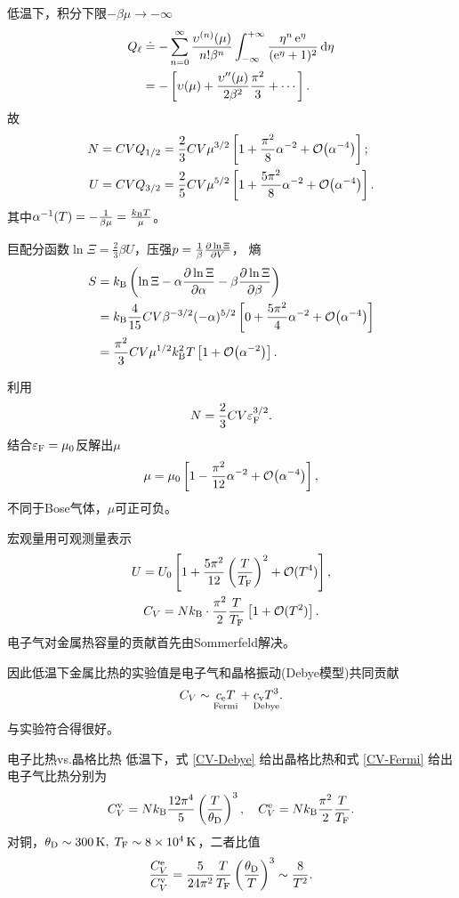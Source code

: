 低温下，积分下限$-\beta\mu\to-\infty$
\begin{align*}
	Q_\ell&\doteq-\sum_{n=0}^{\infty}\frac{\upsilon^{(n)}(\mu)}{n!\beta^n}\int_{-\infty}^{+\infty}\frac{\eta^n\mathop{}\!\mathrm{e}^\eta}{(\mathop{}\!\mathrm{e}^\eta+1)^2}\mathop{}\!\mathrm{d}\eta\\
	&=-\left[\upsilon(\mu)+\frac{\upsilon''(\mu)}{2\beta^2}\frac{\pi^2}3+\cdots\right].
\end{align*}
故
\begin{align}
	N=CVQ_{1/2}&=\frac23CV\mu^{3/2}\left[1+\frac{\pi^2}8\alpha^{-2}+\mathcal O\!\left(\alpha^{-4}\right)\right];\\
	U=CVQ_{3/2}&=\frac25CV\mu^{5/2}\left[1+\frac{5\pi^2}8\alpha^{-2}+\mathcal O\!\left(\alpha^{-4}\right)\right].
\end{align}
其中$\alpha^{-1}(T)=-\frac1{\beta\mu}=\frac{k_{\mathrm B} T}{\mu}$。

巨配分函数$\ln\Xi=\frac23\beta U$，压强$p=\frac1\beta\frac{\partial^{\;\!\!}\ln\Xi}{\partial V^{\;\!\!}}$，
熵
\begin{align}\notag
	S&=\kB\kh{\ln\Xi-\alpha\pv{\ln\Xi}\alpha-\beta\pv{\ln\Xi}\beta}\\\notag
	&=\kB\frac4{15}CV\beta^{-3/2}(-\alpha)^{5/2}\fkh{0+\frac{5\pi^2}4\alpha^{-2}+\bigo\!\kh{\alpha^{-4}}}\\
	&=\frac{\pi^2}3CV\mu^{1/2}\kB^2T\fkh{1+\bigo\!\kh{\alpha^{-2}}}.
\end{align}

利用
\[
	N=\frac23CV\varepsilon_\mathrm F^{3/2}.
\]
结合$\varepsilon_\mathrm F=\mu_0$反解出$\mu$
\[
	\mu=\mu_0\left[1-\frac{\pi^2}{12}\alpha^{-2}+\mathcal O\!\left(\alpha^{-4}\right)\right],
\]
不同于Bose气体，$\mu$可正可负。

宏观量用可观测量表示
\begin{gather}
	U=U_0\left[1+\frac{5\pi^2}{12}\left(\frac T{T_\mathrm F}\right)^2+\mathcal O(T^4)\right],\\
	C_V=Nk_{\mathrm B}\cdot\frac{\pi^2}{2}\frac T{T_\mathrm F}\left[1+\mathcal O(T^2)\right].\label{CV-Fermi}
\end{gather}
电子气对金属热容量的贡献首先由Sommerfeld解决。

因此低温下金属比热的实验值是电子气和晶格振动(Debye模型)共同贡献
\[
	C_V\sim \underset{\text{Fermi}}{c_\mathrm e T}+\underset{\text{Debye}}{c_\mathrm v T^3}.
\]
与实验符合得很好。
\begin{example}{电子比热vs.晶格比热}{}
	低温下，式 \ref{CV-Debye} 给出晶格比热和式 \ref{CV-Fermi} 给出电子气比热分别为
	\[
	C_V^\mathrm v=Nk_{\mathrm B}\frac{12\pi^4}5\left(\frac T{\theta_\mathrm D}\right)^3,\quad C_V^\mathrm e=Nk_{\mathrm B}\frac{\pi^2}2\frac T{T_\mathrm F}.
	\]
	对铜，$\theta_\Db\sim\SI{300}\K,\;T_\Fm\sim\SI{8e4}\K$，二者比值
	\[
	\frac{C_V^\mathrm e}{C_V^\mathrm v}=\frac5{24\pi^2}\frac T{T_\mathrm F}\left(\frac{\theta_\mathrm D}T\right)^3\sim\frac8{T^2}.
	\]
\end{example}
\clearpage
